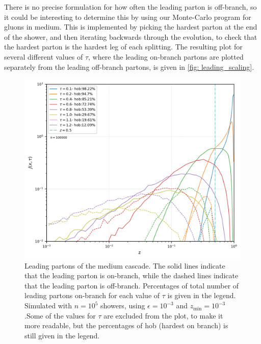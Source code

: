 \documentclass[main.tex]{subfiles}
\begin{document}
There is no precise formulation for how often the leading parton is off-branch, so it could be interesting to determine this by using our Monte-Carlo program for gluons in medium. This is implemented by picking the hardest parton at the end of the shower, and then iterating backwards through the evolution, to check that the hardest parton is the hardest leg of each splitting. The resulting plot for several different values of \(\tau\), where the leading on-branch partons are plotted separately from the leading off-branch partons, is given in \autoref{fig: leading_scaling}. 
\begin{figure}[htb]
    \centering
    \includegraphics[width=12cm]{pictures/plots/distributions/leading/leading_scaling_100k.png}
    \caption{Leading partons of the medium cascade. The solid lines indicate that the leading parton is on-branch, while the dashed lines indicate that the leading parton is off-branch. Percentages of total number of leading partons on-branch for each value of \(\tau\) is given in the legend. Simulated with \(n=10^{5}\) showers, using \(\epsilon=10^{-3}\) and \(z_{\text{min}}=10^{-3}\).Some of the values for \(\tau\) are excluded from the plot, to make it more readable, but the percentages of hob (hardest on branch) is still given in the legend.}
    \label{fig: leading_scaling}
\end{figure}
\end{document}
